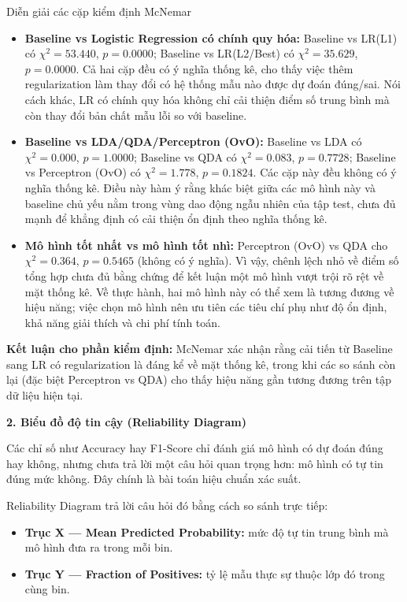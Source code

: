 \begin{warningbox}{Diễn giải các cặp kiểm định McNemar}
\begin{itemize}
    \item \textbf{Baseline vs Logistic Regression có chính quy hóa:}
    Baseline vs LR(L1) có $\chi^2=53.440$, $p=0.0000$; Baseline vs LR(L2/Best) có $\chi^2=35.629$, $p=0.0000$. Cả hai cặp đều có ý nghĩa thống kê, cho thấy việc thêm regularization làm thay đổi có hệ thống mẫu nào được dự đoán đúng/sai. Nói cách khác, LR có chính quy hóa không chỉ cải thiện điểm số trung bình mà còn thay đổi bản chất mẫu lỗi so với baseline.

    \item \textbf{Baseline vs LDA/QDA/Perceptron (OvO):}
    Baseline vs LDA có $\chi^2=0.000$, $p=1.0000$; Baseline vs QDA có $\chi^2=0.083$, $p=0.7728$; Baseline vs Perceptron (OvO) có $\chi^2=1.778$, $p=0.1824$. Các cặp này đều không có ý nghĩa thống kê. Điều này hàm ý rằng khác biệt giữa các mô hình này và baseline chủ yếu nằm trong vùng dao động ngẫu nhiên của tập test, chưa đủ mạnh để khẳng định có cải thiện ổn định theo nghĩa thống kê.

    \item \textbf{Mô hình tốt nhất vs mô hình tốt nhì:}
    Perceptron (OvO) vs QDA cho $\chi^2=0.364$, $p=0.5465$ (không có ý nghĩa). Vì vậy, chênh lệch nhỏ về điểm số tổng hợp chưa đủ bằng chứng để kết luận một mô hình vượt trội rõ rệt về mặt thống kê. Về thực hành, hai mô hình này có thể xem là tương đương về hiệu năng; việc chọn mô hình nên ưu tiên các tiêu chí phụ như độ ổn định, khả năng giải thích và chi phí tính toán.
\end{itemize}
\end{warningbox}

\textbf{Kết luận cho phần kiểm định:} McNemar xác nhận rằng cải tiến từ Baseline sang LR có regularization là đáng kể về mặt thống kê, trong khi các so sánh còn lại (đặc biệt Perceptron vs QDA) cho thấy hiệu năng gần tương đương trên tập dữ liệu hiện tại.

\textbf{2. Biểu đồ độ tin cậy (Reliability Diagram)}

Các chỉ số như Accuracy hay F1-Score chỉ đánh giá mô hình có dự đoán đúng hay không, nhưng chưa trả lời một câu hỏi quan trọng hơn: mô hình có tự tin đúng mức không. Đây chính là bài toán hiệu chuẩn xác suất.

Reliability Diagram trả lời câu hỏi đó bằng cách so sánh trực tiếp:

\begin{itemize}
    \item \textbf{Trục X --- Mean Predicted Probability:} mức độ tự tin trung bình mà mô hình đưa ra trong mỗi bin.
    \item \textbf{Trục Y --- Fraction of Positives:} tỷ lệ mẫu thực sự thuộc lớp đó trong cùng bin.
\end{itemize}

